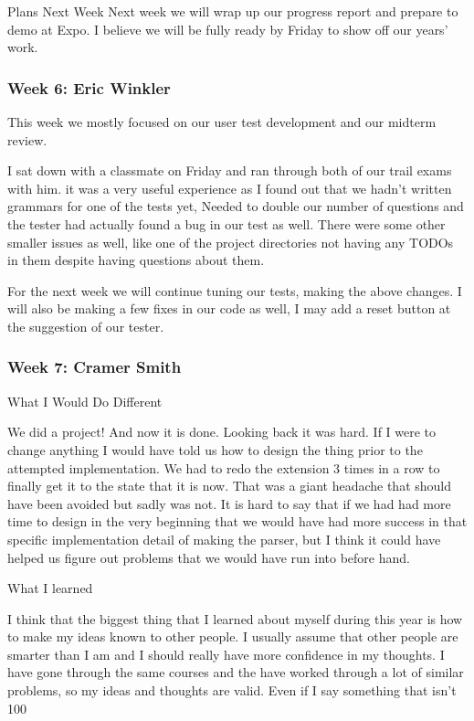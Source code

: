 Plans Next Week
Next week we will wrap up our progress report and prepare to demo at Expo. I believe we will be fully ready by Friday to show off our years' work.

\subsubsection{Week 6: Eric Winkler}

This week we mostly focused on our user test development and our midterm review.

I sat down with a classmate on Friday and ran through both of our trail exams with him. 
it was a very useful experience as I found out that we hadn't written grammars for one of the tests yet, Needed to double our number of questions and the tester had actually found a bug in our test as well. There were some other smaller issues as well, like one of the project directories not having any TODOs in them despite having questions about them.

For the next week we will continue tuning our tests, making the above changes. I will also be making a few fixes in our code as well, I may add a reset button at the suggestion of our tester.

\subsubsection{Week 7: Cramer Smith}

What I Would Do Different

We did a project! And now it is done. Looking back it was hard. If I were to change anything I would have told us how to design the thing prior to the attempted implementation. We had to redo the extension 3 times in a row to finally get it to the state that it is now. That was a giant headache that should have been avoided but sadly was not. It is hard to say that if we had had more time to design in the very beginning that we would have had more success in that specific implementation detail of making the parser, but I think it could have helped us figure out problems that we would have run into before hand.

What I learned

I think that the biggest thing that I learned about myself during this year is how to make my ideas known to other people. I usually assume that other people are smarter than I am and I should really have more confidence in my thoughts. I have gone through the same courses and the have worked through a lot of similar problems, so my ideas and thoughts are valid. Even if I say something that isn't 100%

